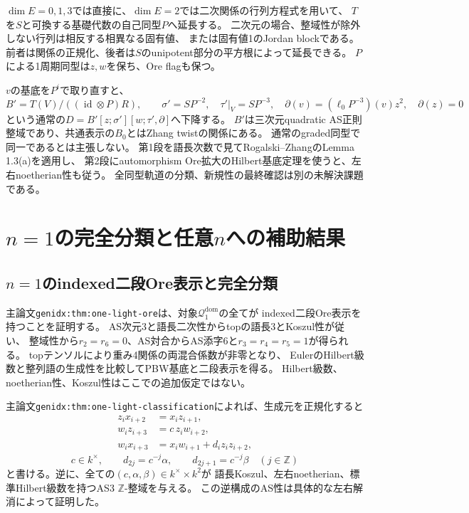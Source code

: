 \documentclass[11pt,a4paper]{ltjsarticle}
\begin{document}
$\dim E=0,1,3$では直接に、$\dim E=2$では二次関係の行列方程式を用いて、
$T$を$S$と可換する基礎代数の自己同型$P$へ延長する。
二次元の場合、整域性が除外しない行列は相反する相異なる固有値、
または固有値1のJordan blockである。
前者は関係の正規化、後者は$S$のunipotent部分の平方根によって延長できる。
$P$による1周期同型は$z,w$を保ち、Ore flagも保つ。

$v$の基底を$P^i$で取り直すと、
\[
B'=T(V)/((\operatorname{id}\otimes P)R),\qquad
\sigma'=SP^{-2},\quad\tau'|_V=SP^{-3},\quad
\partial(v)=(\ell_0P^{-3})(v)z^2,\quad\partial(z)=0
\]
という通常の$D=B'[z;\sigma'][w;\tau',\partial]$へ下降する。
$B'$は三次元quadratic AS正則整域であり、共通表示の$B_0$とはZhang twistの関係にある。
通常のgraded同型で同一であるとは主張しない。
第1段を語長次数で見てRogalski--ZhangのLemma 1.3(a)を適用し、
第2段にautomorphism Ore拡大のHilbert基底定理を使うと、左右noetherian性も従う。
全同型軌道の分類、新規性の最終確認は別の未解決課題である。

\section{\texorpdfstring{$n=1$}{n=1}の完全分類と任意\texorpdfstring{$n$}{n}への補助結果}
\subsection{\texorpdfstring{$n=1$}{n=1}のindexed二段Ore表示と完全分類}
主論文\texttt{genidx:thm:one-light-ore}は、対象$\mathcal Q_1^{\mathrm{dom}}$の全てが
indexed二段Ore表示を持つことを証明する。
AS次元3と語長二次性からtopの語長3とKoszul性が従い、
整域性から$r_2=r_6=0$、AS対合からAS添字6と$r_3=r_4=r_5=1$が得られる。
topテンソルにより重み4関係の両混合係数が非零となり、
EulerのHilbert級数と整列語の生成性を比較してPBW基底と二段表示を得る。
Hilbert級数、noetherian性、Koszul性はここでの追加仮定ではない。

主論文\texttt{genidx:thm:one-light-classification}によれば、生成元を正規化すると
\begin{align*}
z_i x_{i+2}&=x_i z_{i+1},\\
w_i z_{i+3}&=c\,z_i w_{i+2},\\
w_i x_{i+3}&=x_iw_{i+1}+d_i z_i z_{i+2},
\end{align*}
\[
c\in k^\times,\qquad
d_{2j}=c^{-j}\alpha,\qquad d_{2j+1}=c^{-j}\beta
\quad(j\in\mathbb Z)
\]
と書ける。逆に、全ての$(c,\alpha,\beta)\in k^\times\times k^2$が
語長Koszul、左右noetherian、標準Hilbert級数を持つAS3 $\mathbb Z$-整域を与える。
この逆構成のAS性は具体的な左右解消によって証明した。
\end{document}

